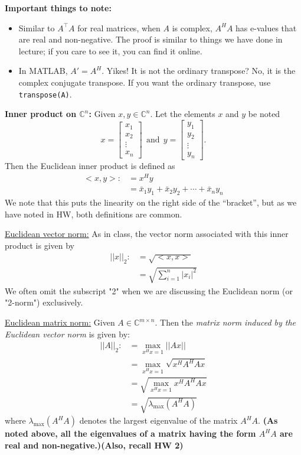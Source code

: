 \documentclass[letterpaper]{article}
\newcommand{\cp}{\mathbb C}    %
\begin{document}
\noindent \textbf{Important things to note:}
\begin{itemize}
\item Similar to $A^\top A$ for real matrices, when $A$ is complex, $A^HA$ has e-values that are real and non-negative. The proof is similar to things we have done in lecture; if you care to see it, you can find it online.

\item In MATLAB, $A'= A^H$. Yikes! It is not the ordinary transpose? No, it is the complex conjugate transpose. If you want the ordinary transpose, use \texttt{transpose(A)}.
\end{itemize}

\newpage


\vspace*{2cm}

\noindent \textbf{Inner product on $\cp^n$:} Given $x,y \in \cp^n$. Let the elements $x$ and $y$ be noted
$$x=\begin{bmatrix}x_1 \\ x_2 \\ \vdots \\ x_n \end{bmatrix} ~~\mbox{and} ~~y=\begin{bmatrix}y_1 \\ y_2 \\ \vdots \\ y_n \end{bmatrix}.$$
Then the Euclidean inner product is defined as
\begin{align}
<x,y>:&=x^H y \\ &=\bar{x}_1 y_1 +\bar{x}_2 y_2+\cdots+\bar{x}_n y_n
\end{align}
We note that this puts the linearity on the right side of the ``bracket'', but as we have noted in HW, both definitions are common.

\newpage

\noindent \underline{Euclidean vector norm:} As in class, the vector norm associated with this inner product is given by
\begin{align}||x||_2:&=\sqrt{<x,x>} \\
&=\sqrt{\sum\limits_{i=1}^n |x_i|^2 }\end{align}
We often omit the subscript "2"  when we are discussing the Euclidean norm (or "2-norm") exclusively.

\noindent \underline{Euclidean matrix norm:} Given $A\in \cp^{m\times n}$. Then the \textit{matrix norm induced by the Euclidean vector norm} is given by:
\begin{align}||A||_2:&=\max_{x^Hx = 1} ||Ax|| \\
& = \max_{x^Hx = 1}  \sqrt{x^HA^HAx} \\
& = \sqrt{\max_{x^Hx = 1} x^HA^HAx} \\
&=\sqrt{\lambda_{\text{max}}(A^H A)}\end{align}
where $\lambda_{\text{max}}(A^H A)$ denotes the largest eigenvalue of the matrix $A^H A$. \textbf{(As noted above, all the eigenvalues of a matrix having the form $A^H A$ are real and non-negative.)(Also, recall HW 2)}
\end{document}

